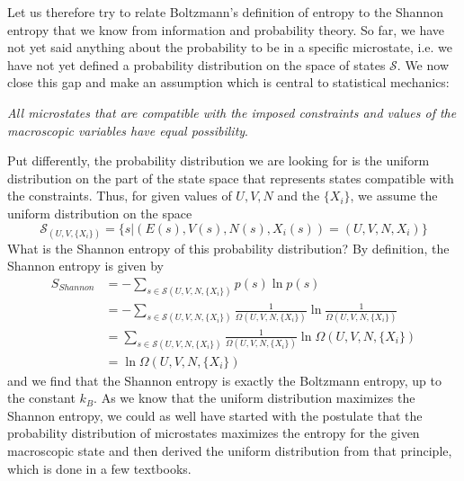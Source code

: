 \documentclass[a4paper, draft]{article}
\theoremstyle{own}
\theoremstyle{remark}
\begin{document}
Let us therefore try to relate Boltzmann's  definition of entropy to the Shannon entropy that we know from information and probability theory. So far, we have not yet said anything about the probability to be in a specific microstate, i.e. we have not yet defined a probability distribution on the space of states ${\mathcal S}$. We now close this gap and make an assumption which is central to statistical mechanics: 

{\em All microstates that are compatible with the imposed constraints and values of the macroscopic variables have equal possibility}. 

Put differently, the probability distribution we are looking for is the uniform distribution on the part of the state space that represents states compatible with the constraints. Thus, for given values of $U,V,N$ and the $\{ X_i\}$, we assume the uniform distribution on the space
$$
{\mathcal S}_{(U,V, \{ X_i\})} = \{ s | (E(s), V(s), N(s), X_i(s)) = (U,V,N,X_i)\}
$$
What is the Shannon entropy of this probability distribution? By definition, the Shannon entropy is given by
\begin{align*}
S_{Shannon} &= - \sum_{s \in {\mathcal S}(U,V,N, \{X_i\})} p(s) \ln p(s) \\
&= - \sum_{s \in {\mathcal S}(U,V,N, \{X_i\})} \frac{1}{\Omega(U,V,N, \{X_i\})} 
\ln \frac{1}{\Omega(U,V,N, \{X_i\})} \\
&= \sum_{s \in {\mathcal S}(U,V,N, \{X_i\})} \frac{1}{\Omega(U,V,N, \{X_i\})}  
\ln \Omega(U,V,N, \{X_i\}) \\& = \ln \Omega(U,V,N, \{X_i\}) 
\end{align*}
and we find that the Shannon entropy is exactly the Boltzmann entropy, up to the constant $k_B$. As we know that the uniform distribution maximizes the Shannon entropy, we could as well have started with the postulate that the probability distribution of microstates maximizes the entropy for the given macroscopic state and then derived the uniform distribution from that principle, which is done in a few textbooks.
\end{document}
